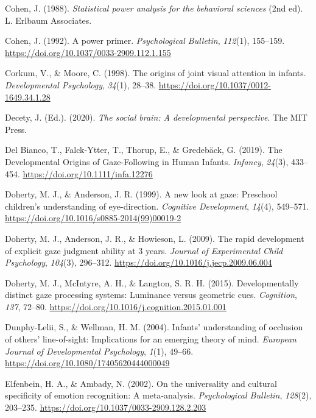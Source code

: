 \documentclass[
  man,floatsintext]{apa7}
\newlength{\cslhangindent}
\newenvironment{CSLReferences}[2] %
 {\begin{list}{}{%
  \setlength{\itemindent}{0pt}
  \setlength{\leftmargin}{0pt}
  \setlength{\parsep}{0pt}
  \ifodd #1
   \setlength{\leftmargin}{\cslhangindent}
   \setlength{\itemindent}{-1\cslhangindent}
  \fi
  \setlength{\itemsep}{#2\baselineskip}}}
 {\end{list}}
\begin{document}
\begin{CSLReferences}{1}{0}
Cohen, J. (1988). \emph{Statistical power analysis for the behavioral sciences} (2nd ed). L. Erlbaum Associates.

Cohen, J. (1992). A power primer. \emph{Psychological Bulletin}, \emph{112}(1), 155--159. \url{https://doi.org/10.1037/0033-2909.112.1.155}

Corkum, V., \& Moore, C. (1998). The origins of joint visual attention in infants. \emph{Developmental Psychology}, \emph{34}(1), 28--38. \url{https://doi.org/10.1037/0012-1649.34.1.28}

Decety, J. (Ed.). (2020). \emph{The social brain: {A} developmental perspective}. The MIT Press.

Del Bianco, T., Falck-Ytter, T., Thorup, E., \& Gredebäck, G. (2019). The {Developmental Origins} of {Gaze-Following} in {Human Infants}. \emph{Infancy}, \emph{24}(3), 433--454. \url{https://doi.org/10.1111/infa.12276}

Doherty, M. J., \& Anderson, J. R. (1999). A new look at gaze: {Preschool} children's understanding of eye-direction. \emph{Cognitive Development}, \emph{14}(4), 549--571. \url{https://doi.org/10.1016/s0885-2014(99)00019-2}

Doherty, M. J., Anderson, J. R., \& Howieson, L. (2009). The rapid development of explicit gaze judgment ability at 3 years. \emph{Journal of Experimental Child Psychology}, \emph{104}(3), 296--312. \url{https://doi.org/10.1016/j.jecp.2009.06.004}

Doherty, M. J., McIntyre, A. H., \& Langton, S. R. H. (2015). Developmentally distinct gaze processing systems: {Luminance} versus geometric cues. \emph{Cognition}, \emph{137}, 72--80. \url{https://doi.org/10.1016/j.cognition.2015.01.001}

Dunphy-Lelii, S., \& Wellman, H. M. (2004). Infants' understanding of occlusion of others' line-of-sight: {Implications} for an emerging theory of mind. \emph{European Journal of Developmental Psychology}, \emph{1}(1), 49--66. \url{https://doi.org/10.1080/17405620444000049}

Elfenbein, H. A., \& Ambady, N. (2002). On the universality and cultural specificity of emotion recognition: {A} meta-analysis. \emph{Psychological Bulletin}, \emph{128}(2), 203--235. \url{https://doi.org/10.1037/0033-2909.128.2.203}


\end{CSLReferences}
\end{document}
